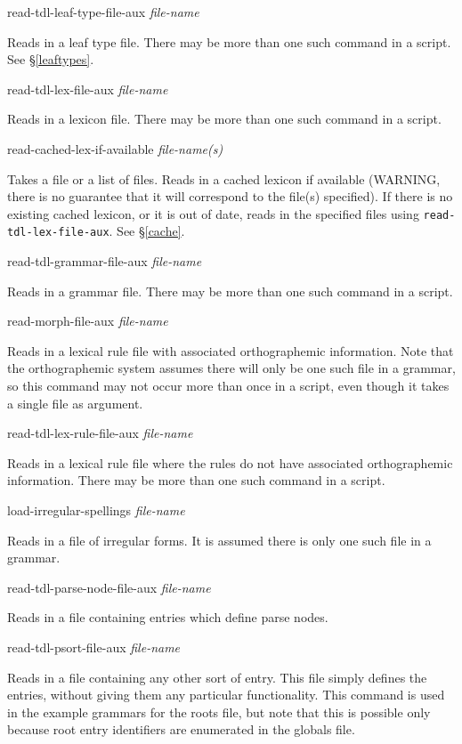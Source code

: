 \documentclass[12pt]{report}
\newcommand{\lispcommand}[1]{\noindent\rm #1}%
\begin{document}
\lispcommand{read-tdl-leaf-type-file-aux {\it file-name}}

Reads in a leaf type file.  There may be more than one such command
in a script.
See \S\ref{leaftypes}.

\lispcommand{read-tdl-lex-file-aux {\it file-name}}

Reads in a lexicon file. There may be more than one such command
in a script.

\lispcommand{read-cached-lex-if-available {\it file-name(s)}}

Takes a file or a list of files.
Reads in a cached lexicon if available (WARNING, there is no
guarantee that it will correspond to the file(s) specified).
If there is no existing cached lexicon, or it is out of date,
reads in the specified files using {\tt read-tdl-lex-file-aux}.
See \S\ref{cache}.

\lispcommand{read-tdl-grammar-file-aux {\it file-name}}

Reads in a grammar file. There may be more than one such command
in a script.

\lispcommand{read-morph-file-aux {\it file-name}}

Reads in a lexical rule file with associated orthographemic information.
Note that the orthographemic system assumes there will only
be one such file in a grammar, so this command
may not occur more than once in a script, even 
though it takes a single file as argument.

\lispcommand{read-tdl-lex-rule-file-aux {\it file-name}}

Reads in a lexical rule file where the rules do not have
associated orthographemic information.
There may be more than one such command
in a script.

\lispcommand{load-irregular-spellings {\it file-name}}

Reads in a file of irregular forms.  It is assumed there is
only one such file in a grammar.

\lispcommand{read-tdl-parse-node-file-aux {\it file-name}}

Reads in a file containing entries which define parse nodes.

\lispcommand{read-tdl-psort-file-aux {\it file-name}}

Reads in a file containing any other sort of entry.  
This file simply defines the entries, without giving them
any particular functionality.
This command is used
in the example grammars for the
roots file, but note that this is possible only because root entry
identifiers
are enumerated in the globals file.
\end{document}
